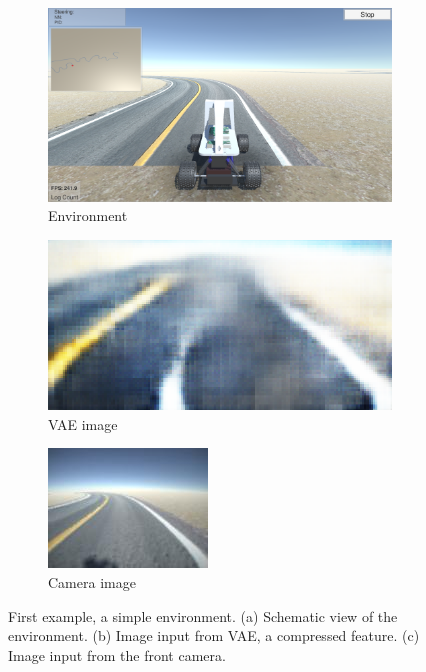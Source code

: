 \documentclass{article} %
\begin{document}
\begin{figure}[ht]
\centering
\begin{subfigure}[b]{0.4\textwidth}
\centering
\includegraphics[width=\textwidth]{fig4a_simple_env.png}
\caption{Environment}
\label{fig:gull}
\end{subfigure}%
\begin{subfigure}[b]{0.45\textwidth}
\centering
\includegraphics[width=\textwidth]{fig4c_vae.png}
\caption{VAE image}
\label{fig:gull}
\end{subfigure}%

\begin{subfigure}[b]{0.35\textwidth}
\centering
\includegraphics[width=\textwidth]{fig4b_camera.jpg}
\caption{Camera image}
\label{fig:gull}
\end{subfigure}%
\caption{First example, a simple environment. (a) Schematic view of the environment. (b) Image input from VAE, a compressed feature. (c) Image input from the front camera.}
\end{figure}
\end{document}
